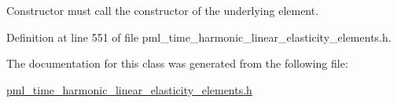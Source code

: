 Constructor must call the constructor of the underlying element. 



Definition at line 551 of file pml\+\_\+time\+\_\+harmonic\+\_\+linear\+\_\+elasticity\+\_\+elements.\+h.



The documentation for this class was generated from the following file\+:\begin{DoxyCompactItemize}
\item 
\hyperlink{pml__time__harmonic__linear__elasticity__elements_8h}{pml\+\_\+time\+\_\+harmonic\+\_\+linear\+\_\+elasticity\+\_\+elements.\+h}\end{DoxyCompactItemize}

